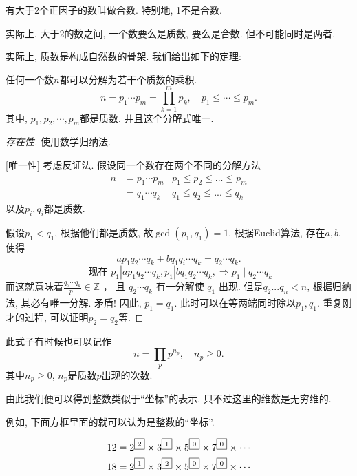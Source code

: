 \documentclass{ctexart}
\begin{document}
\begin{definition}[合数] 有大于2个正因子的数叫做合数. 特别地, 1不是合数. 
\end{definition}

实际上, 大于2的数之间, 一个数要么是质数, 要么是合数. 但不可能同时是两者. 

实际上, 质数是构成自然数的骨架. 我们给出如下的定理: 

\begin{theorem}[唯一分解定理] 任何一个数$n$都可以分解为若干个质数的乘积. 
    $$
n=p_1 \cdots p_m=\prod_{k=1}^m p_k, \quad p_1 \leqslant \cdots \leqslant p_m .
$$
其中, $p_1, p_2, \cdots, p_m$都是质数. 并且这个分解式唯一. 
    
\end{theorem}

\begin{proof}
    [存在性] 使用数学归纳法. 

    [唯一性] 考虑反证法. 假设同一个数存在两个不同的分解方法
    $$
\begin{aligned}
    n & =p_1 \cdots p_m & p_1\leq p_2\leq ...\leq p_m\\
      & =q_1 \cdots q_{k} & q_1 \leq q_2 \leq  ... \leq  q_k
\end{aligned}
$$
以及$p_i, q_i$都是质数. 


 假设$p_1<q_1$, 根据他们都是质数, 故$\gcd(p_1, q_1)=1.$ 根据Euclid算法, 存在$a, b$, 使得
$$
a p_1 q_2 \cdots q_k+b q_1 q_i \cdots q_k=q_2 \cdots q_k .
$$
$$
\text { 现在 } p_1\left|a p_1 q_2 \cdots q_k, p_1\right| b q_1 q_2 \cdots q_k, \Rightarrow p_1 \mid q_2 \cdots q_k
$$
而这就意味着$\frac{q_2 \cdots q_k}{p_1} \in \mathbb{Z}$ ， 且 $q_2 \cdots q_k$ 有一分解使 $q_1$ 出现.
但是$q_2 ... q_n < n$, 根据归纳法, 其必有唯一分解. 矛盾! 
因此, $p_1=q_1$. 此时可以在等两端同时除以$p_1, q_1$. 重复刚才的过程, 可以证明$p_2=q_2$等. 

\end{proof}

\begin{remark}
    此式子有时候也可以记作
    $$
n=\prod_p p^{n_p}, \quad n_p \geqslant 0 .
$$
其中$n_p \geq 0$, $n_p$是质数$p$出现的次数. 
\end{remark}

由此我们便可以得到整数类似于``坐标''的表示. 只不过这里的维数是无穷维的. 

例如, 下面方框里面的就可以认为是整数的``坐标''. 

\begin{align*}
12 & =2^{\text{\fbox{2}}}\times3^{\text{\fbox{1}}}\times5^{\text{\fbox{0}}}\times7^{\text{\fbox{0}}}\times\cdots\\
18 & =2^{\text{\fbox{1}}}\times3^{\text{\fbox{2}}}\times5^{\text{\fbox{0}}}\times7^{\text{\fbox{0}}}\times\cdots
\end{align*}
\end{document}

